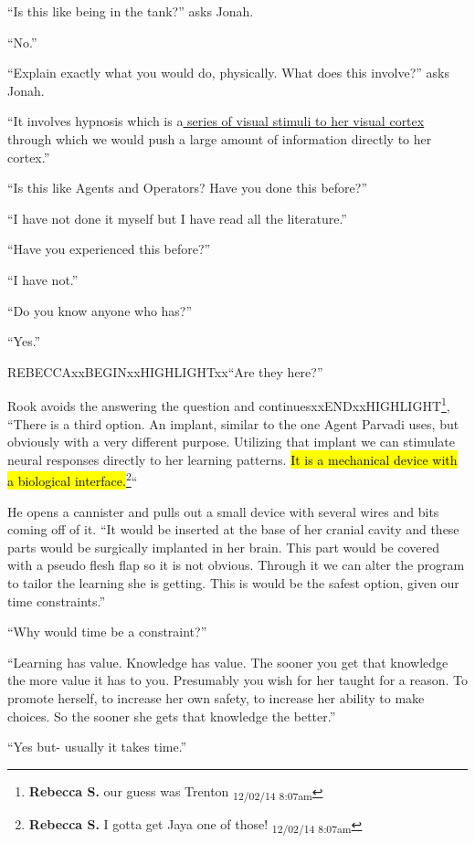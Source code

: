 ``Is this like being in the tank?'' asks Jonah.

``No.''

``Explain exactly what you would do, physically.  What does this involve?'' asks Jonah.

``It involves hypnosis which is a\underline{  {\color[RGB]{17,85,204} series of visual stimuli to her visual cortex}  } through which we would push a large amount of information directly to her cortex.''

``Is this like Agents and Operators?  Have you done this before?''

``I have not done it myself but I have read all the literature.''

``Have you experienced this before?''

``I have not.''

``Do you know anyone who has?''

``Yes.''

REBECCAxxBEGINxxHIGHLIGHTxx``Are they here?''

Rook avoids the answering the question and continuesxxENDxxHIGHLIGHT\footnote{\textbf{Rebecca S. }our guess was Trenton \textsubscript{12/02/14 8:07am}}, ``There is a third option.  An implant, similar to the one Agent Parvadi uses, but obviously with a very different purpose.  Utilizing that implant we can stimulate neural responses directly to her learning patterns.  \hl{It is a mechanical device with a biological interface.}\footnote{\textbf{Rebecca S. }I gotta get Jaya one of those! \textsubscript{12/02/14 8:07am}}``  



He opens a cannister and pulls out a small device with several wires and bits coming off of it.  ``It would be inserted at the base of her cranial cavity and these parts would be surgically implanted in her brain.  This part would be covered with a pseudo flesh flap so it is not obvious.  Through it we can alter the program to tailor the learning she is getting.  This is would be the safest option, given our time constraints.''

``Why would time be a constraint?''

``Learning has value.  Knowledge has value.  The sooner you get that knowledge the more value it has to you.  Presumably you wish for her taught for a reason.  To promote herself, to increase her own safety, to increase her ability to make choices. So the sooner she gets that knowledge the better.''

``Yes but- usually it takes time.''

